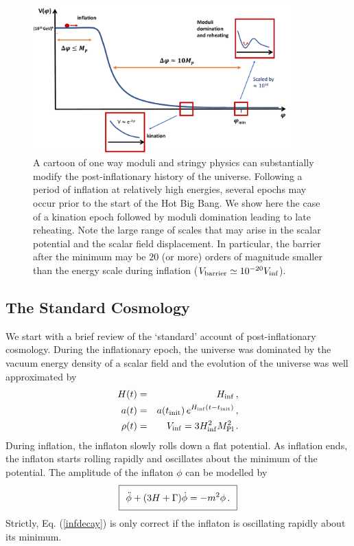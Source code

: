 \begin{figure}[ht]
\centering
\includegraphics[width = 0.9\textwidth]{Sections/Figures/InflationKinationMD.pdf} 
\caption{A cartoon of one way moduli and stringy physics can substantially modify the post-inflationary history of the universe. Following a period of inflation at relatively high energies, several epochs may occur prior to the start of the Hot Big Bang. We show here the case of a kination epoch followed by moduli domination leading to late reheating. Note the large range of scales that may arise in the scalar potential and the scalar 
field displacement. In particular, the barrier after the minimum may be $20$ (or more) orders of magnitude smaller than the energy scale during inflation ($V_{\rm barrier}\simeq 10^{-20} V_{\rm inf}$).}
\label{ReheatingCartoon}
\end{figure}

\subsection{The Standard Cosmology}

We start with a brief review of the `standard' account of post-inflationary cosmology. During the inflationary epoch, the universe was dominated by the vacuum energy density of a scalar field and the evolution of the universe was well approximated by
\begin{eqnarray}
H(t) & = & H_{\rm inf}\,,  \\
a(t) & = & a(t_{\rm init})\, e^{H_{\rm inf}(t - t_{\rm init})}\,,  \\
\rho(t) &=& V_{\rm inf} = 3 H_{\rm inf}^2 M_{\rm Pl}^2\,.
\end{eqnarray}
During inflation, the inflaton slowly rolls down a flat potential. As inflation ends, the inflaton starts rolling rapidly and oscillates about the minimum of the potential. The amplitude of the inflaton $\phi$ can be modelled by
\begin{equation}
\label{infdecay}
\setlength\fboxsep{0.25cm}
\setlength\fboxrule{0.4pt}
\boxed{
\ddot{\phi} + (3 H + \Gamma) \dot{\phi} = - m^2 \phi\,.
}
\end{equation}
Strictly, Eq. (\ref{infdecay}) is only correct if the inflaton is oscillating rapidly about its minimum.


